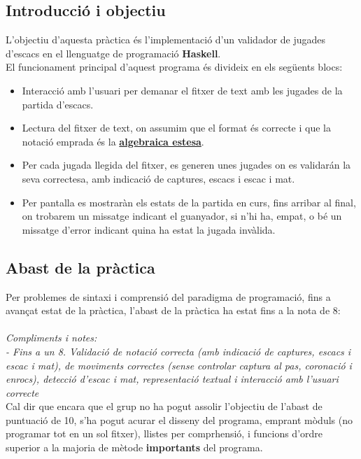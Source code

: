 \documentclass[12pt]{article}
\begin{document}
\subsection{Introducció i objectiu}
L'objectiu d'aquesta pràctica és l'implementació d'un validador de jugades d'escacs en el llenguatge de programació \textbf{Haskell}. \\
El funcionament principal d'aquest programa és divideix en els següents blocs:
\begin{itemize}
\item Interacció amb l'usuari per demanar el fitxer de text amb les jugades de la partida d'escacs. 
\item Lectura del fitxer de text, on assumim que el format és correcte i que la notació emprada és la \href{https://ca.wikipedia.org/wiki/Notaci%C3%B3_algebraica}{\textbf{algebraica estesa}}.
\item Per cada jugada llegida del fitxer, es generen unes jugades on es validarán la seva correctesa, amb indicació de captures, escacs i escac i mat.
\item Per pantalla es mostraràn els estats de la partida en curs, fins arribar al final, on trobarem un missatge indicant el guanyador, si n'hi ha, empat, o bé un missatge d'error indicant quina ha estat la jugada invàlida.
\end{itemize}

\subsection{Abast de la pràctica}

Per problemes de sintaxi i comprensió del paradigma de programació, fins a avançat estat de la pràctica, l'abast de la pràctica ha estat fins a la nota de 8:
\\
\\
\noindent
\textit{Compliments i notes: \\
- Fins a un 8. Validació de notació correcta (amb indicació de captures, escacs i escac i mat), de moviments correctes (sense controlar captura al pas, coronació i enrocs), detecció d’escac i mat, representació textual i interacció amb l’usuari correcte}
\\

\noindent
Cal dir que encara que el grup no ha pogut assolir l'objectiu de l'abast de puntuació de 10, s'ha pogut acurar el disseny del programa, emprant mòduls (no programar tot en un sol fitxer), llistes per comprhensió, i funcions d'ordre superior a la majoria de mètode \textbf{importants} del programa. 
\end{document}
